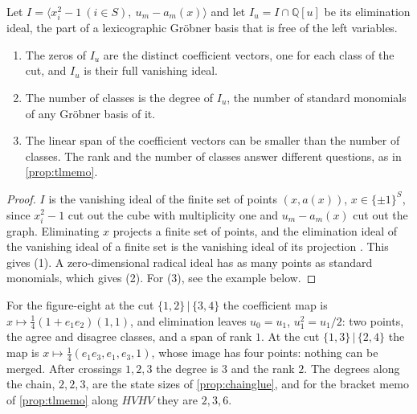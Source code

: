 \documentclass[11pt]{article}
\theoremstyle{definition}\newtheorem{definition}[theorem]{Definition}\newtheorem{remark}[theorem]{Remark}\newtheorem{example}[theorem]{Example}\newtheorem{problem}[theorem]{Open problem}\crefname{problem}{Problem}{Problems}
\begin{document}
\begin{proposition}\label{prop:elimquot}
Let $I=\langle x_i^2-1\ (i\in S),\ u_m-a_m(x)\rangle$ and let $I_u=I\cap\mathbb Q[u]$ be its elimination ideal, the part of a lexicographic Gr\"obner basis that is free of the left variables.
\begin{enumerate}
\item[(1)] The zeros of $I_u$ are the distinct coefficient vectors, one for each class of the cut, and $I_u$ is their full vanishing ideal.
\item[(2)] The number of classes is the degree of $I_u$, the number of standard monomials of any Gr\"obner basis of it.
\item[(3)] The linear span of the coefficient vectors can be smaller than the number of classes. The rank and the number of classes answer different questions, as in \cref{prop:tlmemo}.
\end{enumerate}
\end{proposition}

\begin{proof}
$I$ is the vanishing ideal of the finite set of points $(x,a(x))$, $x\in\{\pm1\}^S$, since $x_i^2-1$ cut out the cube with multiplicity one and $u_m-a_m(x)$ cut out the graph. Eliminating $x$ projects a finite set of points, and the elimination ideal of the vanishing ideal of a finite set is the vanishing ideal of its projection \cite{CoxLittleOShea2015}. This gives (1). A zero-dimensional radical ideal has as many points as standard monomials, which gives (2). For (3), see the example below.
\end{proof}

For the figure-eight at the cut $\{1,2\}\,|\,\{3,4\}$ the coefficient map is $x\mapsto\tfrac14(1+e_1e_2)(1,1)$, and elimination leaves $u_0=u_1$, $u_1^2=u_1/2$: two points, the agree and disagree classes, and a span of rank $1$. At the cut $\{1,3\}\,|\,\{2,4\}$ the map is $x\mapsto\tfrac14(e_1e_3,e_1,e_3,1)$, whose image has four points: nothing can be merged. After crossings $1,2,3$ the degree is $3$ and the rank $2$. The degrees along the chain, $2,2,3$, are the state sizes of \cref{prop:chainglue}, and for the bracket memo of \cref{prop:tlmemo} along $HVHV$ they are $2,3,6$.
\end{document}
